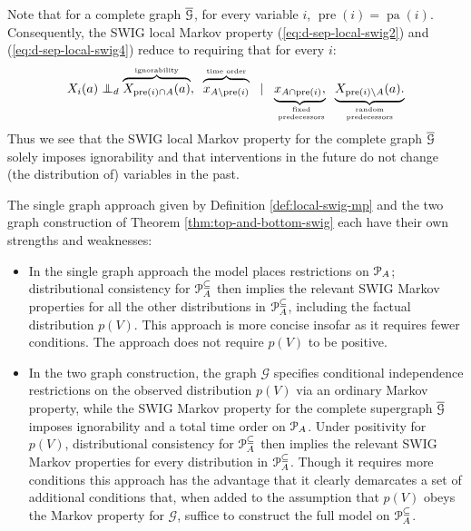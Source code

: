 \documentclass[11pt]{article}
\DeclareMathOperator{\pa}{pa}
\DeclareMathOperator{\pre}{pre}
\newcommand{\G}{{\mathscr G}}
\newcommand\indepd{\protect\mathpalette{\protect\independenTd}{\perp}}
\def\independenTd#1#2{\mathrel{\rlap{$#1#2$}\mkern2.5mu{#1#2}_d}}
\begin{document}
{Note that for a complete graph $\overline{\cal G}$, for every variable $i$, $\pre(i) = \pa(i)$. Consequently, 
the SWIG local Markov property (\ref{eq:d-sep-local-swig2}) and (\ref{eq:d-sep-local-swig4}) reduce to requiring that for every $i$: 
\begin{align}\label{eq:d-sep-local-swig2-comp}
 X_i({a}) \indepd 
 \overbrace{X_{\pre(i) \cap A}(a)}^{\hbox{\tiny ignorability}},\;\;
 \overbrace{\vphantom{X}x_{A\setminus \pre(i)}}^{\hbox{\tiny time order}}\;\;   
\mid 
\underbrace{x_{A \cap \pre(i)},}_{\hbox{\tiny~~ \parbox{40pt}{\centering fixed predecessors}~~}}
\underbrace{X_{\pre(i) \setminus A}(a).}_{\hbox{\tiny ~~\parbox{40pt}{\centering random predecessors}~~}}
 \end{align}
 Thus we see that the SWIG local Markov property for  the complete graph $\overline{\cal G}$ solely imposes ignorability and that interventions in the future do not change (the distribution of) variables in the past. 

\medskip

The single graph approach given by Definition \ref{def:local-swig-mp}
and the two graph construction of Theorem \ref{thm:top-and-bottom-swig} each have their own strengths and weaknesses:

\begin{itemize}
\item In the single graph approach the model places restrictions on ${\cal P}_A$; distributional consistency for
${\cal P}^{\subseteq}_A$ then implies the relevant SWIG Markov properties for all the other distributions in ${\cal P}^{\subseteq}_A$, including the factual distribution $p(V)$. This approach is more concise insofar as it requires fewer conditions. The approach does not require $p(V)$ to be positive.
\item In the two graph construction, the graph $\G$ specifies conditional independence restrictions on the observed distribution $p(V)$ via an ordinary Markov property, while the SWIG Markov property for the complete supergraph $\overline{\cal G}$ imposes ignorability and a total time order on ${\cal P}_A$. Under positivity for $p(V)$, distributional consistency for ${\cal P}^{\subseteq}_A$ then implies the relevant SWIG Markov properties for every distribution in ${\cal P}^{\subseteq}_A$. Though it requires more conditions this approach has the advantage that it clearly demarcates a set of additional  conditions that, when added to the assumption that $p(V)$ obeys the Markov property for $\G$, suffice to construct the full model on ${\cal P}^{\subseteq}_A$.
\end{itemize}

}
\end{document}
